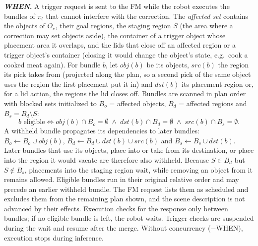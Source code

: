 \noindent\textbf{\textit{WHEN}.} A trigger request is sent to the FM while the robot executes the bundles of
$\pi_t$ that cannot interfere with the correction. The \emph{affected set} contains the objects of $O_e$, their
goal regions, the staging region $S$ (the area where a correction may set objects aside), the container of a
trigger object whose placement area it overlaps, and the lids that close off an affected region or a trigger
object's container (closing it would change the object's state, e.g.\ cook a cooked meat again). For bundle
$b$, let $\mathit{obj}(b)$ be its objects, $\mathit{src}(b)$ the region its pick takes from (projected along the
plan, so a second pick of the same object uses the region the first placement put it in) and $\mathit{dst}(b)$
its placement region or, for a lid action, the regions the lid closes off. Bundles are scanned in plan order
with blocked sets initialized to $B_o$ = affected objects, $B_d$ = affected regions and $B_s=B_d\setminus S$:
\begin{equation}
b \text{ eligible} \iff \mathit{obj}(b)\cap B_o=\emptyset \;\wedge\; \mathit{dst}(b)\cap B_d=\emptyset
\;\wedge\; \mathit{src}(b)\cap B_s=\emptyset .
\label{eq:supp-eligible}
\end{equation}
A withheld bundle propagates its dependencies to later bundles:
$B_o\!\leftarrow\!B_o\cup\mathit{obj}(b)$, $B_d\!\leftarrow\!B_d\cup\mathit{dst}(b)\cup\mathit{src}(b)$ and
$B_s\!\leftarrow\!B_s\cup\mathit{dst}(b)$. Later bundles that use its objects, place into or take from its
destination, or place into the region it would vacate are therefore also withheld. Because $S\in B_d$ but
$S\notin B_s$, placements into the staging region wait, while removing an object from it remains allowed.
Eligible bundles run in their original relative order and may precede an earlier withheld bundle. The FM request
lists them as scheduled and excludes them from the remaining plan shown, and the scene description is not
advanced by their effects. Execution checks for the response only between bundles; if no eligible bundle is
left, the robot waits. Trigger checks are suspended during the wait and resume after the merge. Without
concurrency ($-$WHEN), execution stops during inference.

